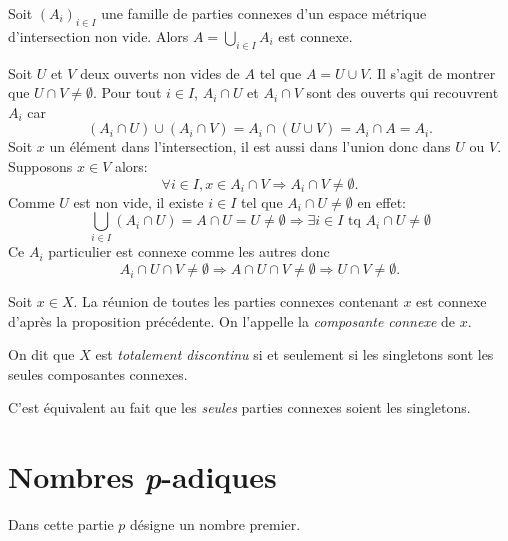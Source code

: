 \begin{prop}
 Soit $(A_i)_{i\in I}$ une famille de parties connexes d'un espace métrique d'intersection non vide. Alors $A = \bigcup_{i\in I}A_i$ est connexe.
\end{prop}
\begin{demo}
 Soit $U$ et $V$ deux ouverts non vides de $A$ tel que $A = U \cup V$. Il s'agit de montrer que $U \cap V \neq \emptyset$.\newline
Pour tout $i \in I$, $A_i \cap U$ et $A_i \cap V$ sont des ouverts qui recouvrent $A_i$ car
\begin{displaymath}
 (A_i \cap U) \cup (A_i \cap V) = A_i \cap (U \cup V) = A_i \cap A = A_i.
\end{displaymath}
Soit $x$ un élément dans l'intersection, il est aussi dans l'union donc dans $U$ ou $V$. Supposons $x\in V$ alors:
\begin{displaymath}
 \forall i \in I, x \in A_i \cap V \Rightarrow A_i \cap V \neq \emptyset .
\end{displaymath}
Comme $U$ est non vide, il existe $i \in I$ tel que $A_i \cap U \neq \emptyset$ en effet:
 \begin{displaymath}
  \bigcup_{i \in I}(A_i \cap U) = A \cap U = U \neq \emptyset \Rightarrow \exists i \in I \text{ tq } A_i \cap U \neq \emptyset
 \end{displaymath}
Ce $A_i$ particulier est connexe comme les autres donc
\begin{displaymath}
 A_i \cap U \cap V \neq \emptyset \Rightarrow A \cap U \cap V \neq \emptyset \Rightarrow U \cap V \neq \emptyset.
\end{displaymath}
\end{demo}
\begin{defi}
 Soit $x\in X$. La réunion de toutes les parties connexes contenant $x$ est connexe d'après la proposition précédente. On l'appelle la \emph{composante connexe} de $x$.
\end{defi}
\begin{defi}\label{Def:TotDiscont}
 On dit que $X$ est \emph{totalement discontinu} si et seulement si les singletons sont les seules composantes connexes.
\end{defi}
C'est équivalent au fait que les \emph{seules} parties connexes soient les singletons.



\section{Nombres \emph{p}-adiques}\label{Sec:NbsPadic}
\noindent Dans cette partie $p$ désigne un nombre premier.

